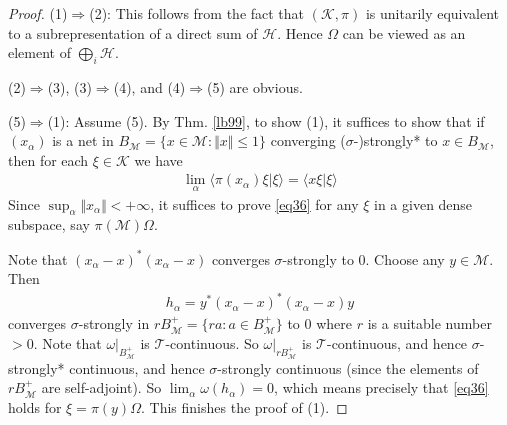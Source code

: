 \documentclass[12pt,b5paper,notitlepage]{article}
\theoremstyle{definition}
\theoremstyle{plain}
\newcommand{\mc}{\mathcal}
\newcommand{\bk}[1]{\langle {#1}\rangle}
\numberwithin{equation}{section}
\begin{document}
\begin{proof}
(1)$\Rightarrow$(2): This follows from the fact that $(\mc K,\pi)$ is unitarily equivalent to a subrepresentation of a direct sum of $\mc H$. Hence $\Omega$ can be viewed as an element of $\bigoplus_i\mc H$.

(2)$\Rightarrow$(3), (3)$\Rightarrow$(4), and (4)$\Rightarrow$(5) are obvious.

(5)$\Rightarrow$(1): Assume (5). By Thm. \ref{lb99}, to show (1), it suffices to show that if $(x_\alpha)$ is a net in $B_{\mc M}=\{x\in\mc M:\Vert x\Vert\leq 1\}$ converging ($\sigma$-)strongly* to $x\in B_{\mc M}$, then for each $\xi\in\mc K$ we have
\begin{align*}
\lim_\alpha \bk{\pi(x_\alpha)\xi|\xi}=\bk{x\xi|\xi} \tag{$\star$}\label{eq36}
\end{align*}
Since $\sup_\alpha\Vert x_\alpha\Vert<+\infty$, it suffices to prove \eqref{eq36} for any $\xi$ in a given dense subspace, say $\pi(\mc M)\Omega$. 

Note that $(x_\alpha-x)^*(x_\alpha-x)$ converges $\sigma$-strongly to $0$. Choose any $y\in\mc M$. Then
\begin{align*}
h_\alpha=y^*(x_\alpha-x)^*(x_\alpha-x)y
\end{align*}
converges $\sigma$-strongly in $rB_{\mc M}^+=\{ra:a\in B_{\mc M}^+\}$ to $0$ where $r$ is a suitable number $>0$. Note that $\omega|_{B_{\mc M}^+}$ is $\mc T$-continuous. So $\omega|_{rB_{\mc M}^+}$ is  $\mc T$-continuous, and hence $\sigma$-strongly* continuous, and hence $\sigma$-strongly continuous (since the elements of $rB_{\mc M}^+$ are self-adjoint). So $\lim_\alpha \omega(h_\alpha)=0$, which means precisely that \eqref{eq36} holds for $\xi=\pi(y)\Omega$. This finishes the proof of (1).
\end{proof}
\end{document}

